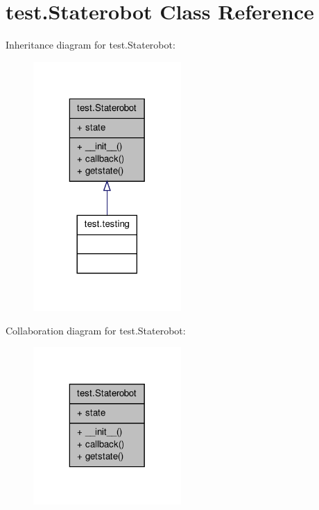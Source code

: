 \hypertarget{classtest_1_1_staterobot}{\section{test.\-Staterobot Class Reference}
\label{classtest_1_1_staterobot}
}


Inheritance diagram for test.\-Staterobot\-:
\nopagebreak
\begin{figure}[H]
\begin{center}
\leavevmode
\includegraphics[width=160pt]{classtest_1_1_staterobot__inherit__graph}
\end{center}
\end{figure}


Collaboration diagram for test.\-Staterobot\-:
\nopagebreak
\begin{figure}[H]
\begin{center}
\leavevmode
\includegraphics[width=160pt]{classtest_1_1_staterobot__coll__graph}
\end{center}
\end{figure}
